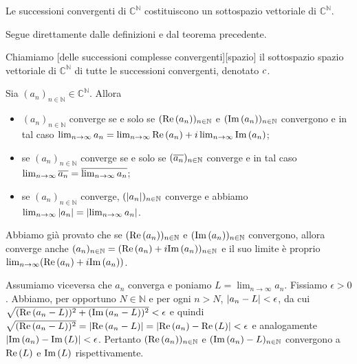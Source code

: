 \begin{Corollary}
	Le successioni convergenti di $\mathbb{C}^\mathbb{N}$ costituiscono un sottospazio vettoriale di $\mathbb{C}^\mathbb{N}$.
\end{Corollary}
\Proof Segue direttamente dalle definizioni e dal teorema precedente. \EndProof
\begin{Definition}
	Chiamiamo [delle successioni complesse convergenti][spazio] il sottospazio spazio vettoriale di $\mathbb{C}^\mathbb{N}$ di tutte le successioni convergenti, denotato $c$.
\end{Definition}
\begin{Theorem}
	Sia $(a_n)_{n \in \mathbb{N}} \in \mathbb{C}^\mathbb{N}$. Allora
	\begin{itemize}
		\item $(a_n)_{n \in \mathbb{N}}$ converge se e solo se $(\text{Re} \left ( a_n \right ))_{n \in \mathbb{N}}$ e $(\text{Im} \left ( a_n \right ))_{n \in \mathbb{N}}$ convergono e in tal caso $\lim_{n \rightarrow \infty} a_n = \lim_{n \rightarrow \infty} \text{Re} \left ( a_n \right ) + i \lim_{n \rightarrow \infty} \text{Im} \left ( a_n \right )$;
		\item se $(a_n)_{n \in \mathbb{N}}$ converge se e solo se $(\overline{a_n})_{n \in \mathbb{N}}$ converge e in tal caso $\lim_{n \rightarrow \infty} \overline{a_n} = \overline{\lim_{n \rightarrow \infty} a_n}$;
		\item se $(a_n)_{n \in \mathbb{N}}$ converge, $(\left \lvert a_n \right \rvert)_{n \in \mathbb{N}}$ converge e abbiamo $\lim_{n \rightarrow \infty} \left \lvert a_n \right \rvert = \left \lvert \lim_{n \rightarrow \infty} a_n \right \rvert$.
	\end{itemize}
\end{Theorem}
\Proof Abbiamo gi\`a provato che se $(\text{Re} \left ( a_n \right ))_{n \in \mathbb{N}}$ e $(\text{Im} \left ( a_n \right ))_{n \in \mathbb{N}}$ convergono, allora converge anche $(a_n)_{n \in \mathbb{N}} = (\text{Re} \left ( a_n \right ) + i \text{Im} \left ( a_n \right ))_{n \in \mathbb{N}}$ e il suo limite \`e proprio $\lim_{n \rightarrow \infty} (\text{Re} \left ( a_n \right ) + i \text{Im} \left ( a_n \right ))$.
\par Assumiamo viceversa che $a_n$ converga e poniamo $L = \lim_{n \rightarrow \infty} a_n$. Fissiamo $\epsilon > 0$. Abbiamo, per opportuno $N \in \mathbb{N}$ e per ogni $n > N$, $\left \lvert a_n - L \right \rvert < \epsilon$, da cui $\sqrt{(\text{Re} \left ( a_n - L \right ))^2 + (\text{Im} \left ( a_n - L \right ))^2} < \epsilon$ e quindi $\sqrt{(\text{Re} \left ( a_n - L \right ))^2} = \left \lvert \text{Re} \left ( a_n - L \right ) \right \rvert = \left \lvert \text{Re} \left ( a_n \right ) - \text{Re} \left ( L \right ) \right \rvert < \epsilon$ e analogamente $\left \lvert \text{Im} \left ( a_n \right ) - \text{Im} \left ( L \right ) \right \rvert < \epsilon$. Pertanto $(\text{Re} \left ( a_n \right ))_{n \in \mathbb{N}}$ e $(\text{Im} \left ( a_n \right ) - L)_{n \in \mathbb{N}}$ convergono a $\text{Re} \left ( L \right )$ e $\text{Im} \left ( L \right )$ rispettivamente.
